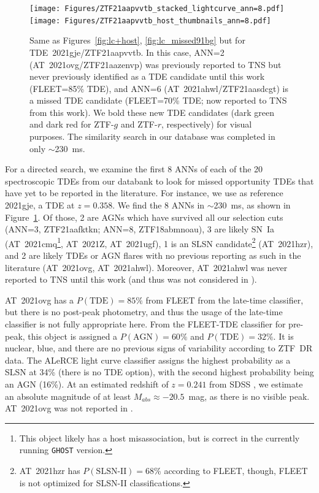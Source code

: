 \documentclass[twocolumn]{aastex63}
\begin{document}
\begin{figure}
    \centering
    \texttt{[image: Figures/ZTF21aapvvtb\_stacked\_lightcurve\_ann=8.pdf]}
    \texttt{[image: Figures/ZTF21aapvvtb\_host\_thumbnails\_ann=8.pdf]}
    \caption{
    Same as Figures~\ref{fig:lc+host}, \ref{fig:lc_missed91bg} but for TDE~2021gje/ZTF21aapvvtb. In this case, ANN=2 (AT~2021ovg/ZTF21aazenvp) was previously reported to TNS but never previously identified as a TDE candidate until this work (FLEET=85\% TDE), and ANN=6 (AT~2021ahwl/ZTF21aasdcgt) is a missed TDE candidate (FLEET=70\% TDE; now reported to TNS from this work). We bold these new TDE candidates (dark green and dark red for ZTF-$g$ and ZTF-$r$, respectively) for visual purposes. The similarity search in our database was completed in only $\sim$230~ms.
    } 
    \label{fig:lc_missedTDE}
\end{figure}

For a directed search, we examine the first 8 ANNs of each of the 20 spectroscopic TDEs from our databank to look for missed opportunity TDEs that have yet to be reported in the literature. For instance, we use as reference 2021gje, a TDE at $z=0.358$. We find the 8 ANNs in $\sim$230~ms, as shown in Figure~\ref{fig:lc_missedTDE}. Of those, 2 are AGNs which have survived all our selection cuts (ANN=3, ZTF21aafktkn; ANN=8, ZTF18abmnoau), 3 are likely SN~Ia (AT~2021cmq\footnote{This object likely has a host misassociation, but is correct in the currently running \texttt{GHOST} version.}, AT~2021Z, AT~2021ugf), 1 is an SLSN candidate\footnote{AT~2021hzr has $P(\text{SLSN-II})=68$\% according to FLEET, though, FLEET is not optimized for SLSN-II classifications.} (AT~2021hzr), and 2 are likely TDEs or AGN flares with no previous reporting as such in the literature (AT~2021ovg, AT~2021ahwl). Moreover, AT~2021ahwl was never reported to TNS until this work (and thus was not considered in \citealt{Gomez2023TDE}). \par

AT~2021ovg has a $P(\text{TDE})=85\%$ from FLEET from the late-time classifier, but there is no post-peak photometry, and thus the usage of the late-time classifier is not fully appropriate here. From the FLEET-TDE classifier for pre-peak, this object is assigned a $P(\text{AGN})=60\%$ and $P(\text{TDE})=32\%$. It is nuclear, blue, and there are no previous signs of variability according to ZTF~DR data. The ALeRCE light curve classifier \citep{SanchezSaez2021} assigns the highest probability as a SLSN at 34\% (there is no TDE option), with the second highest probability being an AGN (16\%). At an estimated redshift of $z=0.241$ from SDSS \citep{Csabai2003}, we estimate an absolute magnitude of at least $M_{abs}\approx-20.5$~mag, as there is no visible peak. AT~2021ovg was not reported in \cite{Gomez2023TDE}. \par
\end{document}

